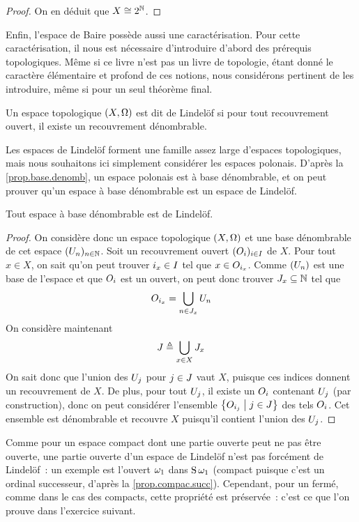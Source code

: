 \begin{proof}
  On en déduit que $X \cong 2^\mathbb N$.
\end{proof}

Enfin, l'espace de Baire possède aussi une caractérisation. Pour cette
caractérisation, il nous est nécessaire d'introduire d'abord des prérequis
topologiques. Même si ce livre n'est pas un livre de topologie, étant donné le
caractère élémentaire et profond de ces notions, nous considérons pertinent de
les introduire, même si pour un seul théorème final.

\begin{definition}
  Un espace topologique $(X,\Omega)$ est dit de Lindelöf si pour tout
  recouvrement ouvert, il existe un recouvrement dénombrable.
\end{definition}

Les espaces de Lindelöf forment une famille assez large d'espaces topologiques,
mais nous souhaitons ici simplement considérer les espaces polonais. D'après
la \cref{prop.base.denomb}, un espace polonais est à base dénombrable, et on
peut prouver qu'un espace à base dénombrable est un espace de Lindelöf.

\begin{lemma}[Lindelöf]\label{lem.lindelof}
  Tout espace à base dénombrable est de Lindelöf.
\end{lemma}

\begin{proof}
  On considère donc un espace topologique $(X,\Omega)$ et une base dénombrable de
  cet espace $(U_n)_{n \in \mathbb N}$. Soit un recouvrement ouvert
  $(O_i)_{i \in I}$ de $X$. Pour tout $x \in X$, on sait qu'on peut
  trouver $i_x \in I$ tel que $x \in O_{i_x}$. Comme $(U_n)$ est
  une base de l'espace et que $O_i$ est un ouvert, on peut donc trouver
  $J_x \subseteq \mathbb N$ tel que
  \[O_{i_x} = \bigcup_{n \in J_x} U_n\]
  On considère maintenant
  \[J \triangleq \bigcup_{x \in X} J_x\]
  On sait donc que l'union des $U_j$ pour $j \in J$ vaut $X$,
  puisque ces indices donnent un recouvrement de $X$. De plus, pour tout
  $U_j$, il existe un $O_i$ contenant $U_j$ (par construction),
  donc on peut considérer l'ensemble $\left\{ O_{i_j} \;\middle\vert\; j \in J \right\}$ des
  tels $O_i$. Cet ensemble est dénombrable et recouvre $X$ puisqu'il
  contient l'union des $U_j$.
\end{proof}

Comme pour un espace compact dont une partie ouverte peut ne pas être ouverte,
une partie ouverte d'un espace de Lindelöf n'est pas forcément de Lindelöf~:
un exemple est l'ouvert $\omega_1$ dans $\operatorname{S}\omega_1$ (compact puisque c'est un
ordinal successeur, d'après la \cref{prop.compac.succ}). Cependant, pour un
fermé, comme dans le cas des compacts, cette propriété est préservée~: c'est ce
que l'on prouve dans l'exercice suivant.

